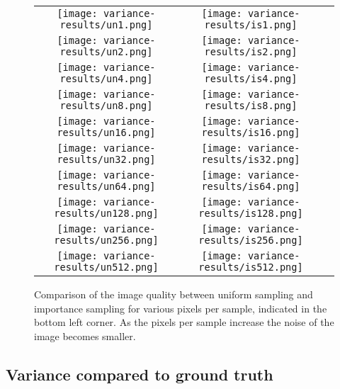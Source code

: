 \documentclass[11pt,a4paper]{report}
\begin{document}
\begin{figure}
\begin{center}
\bgroup
\setlength{\tabcolsep}{0.04em} %
\def\arraystretch{0.2}%
\begin{tabular}{ccc}
\texttt{[image: variance-results/un1.png]} & \texttt{[image: variance-results/is1.png]} \\ \texttt{[image: variance-results/un2.png]} & \texttt{[image: variance-results/is2.png]} \\
\texttt{[image: variance-results/un4.png]} & \texttt{[image: variance-results/is4.png]} \\
\texttt{[image: variance-results/un8.png]} & \texttt{[image: variance-results/is8.png]} \\
\texttt{[image: variance-results/un16.png]} & \texttt{[image: variance-results/is16.png]} \\
\texttt{[image: variance-results/un32.png]} & \texttt{[image: variance-results/is32.png]} \\
\texttt{[image: variance-results/un64.png]} & \texttt{[image: variance-results/is64.png]} \\
\texttt{[image: variance-results/un128.png]} & \texttt{[image: variance-results/is128.png]} \\
\texttt{[image: variance-results/un256.png]} & \texttt{[image: variance-results/is256.png]} \\
\texttt{[image: variance-results/un512.png]} & \texttt{[image: variance-results/is512.png]} \\

\end{tabular}
\egroup
\end{center}
\caption{Comparison of the image quality between uniform sampling and importance sampling for various pixels per sample, indicated in the bottom left corner. As the pixels per sample increase the noise of the image becomes smaller.}
\label{fig_side_by_side}
\end{figure}



\subsection{Variance compared to ground truth}
\label{variance_comparison_gr_truth}
\end{document}
